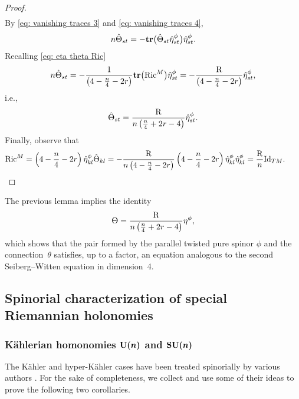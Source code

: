 \documentclass[10pt,a4paper]{amsart}
\newcommand{\tr}{\mbox{\bf tr}}
\numberwithin{equation}{section}
\begin{document}
\begin{proof}
\begin{gather*}
\end{gather*}
By \eqref{eq: vanishing traces 3} and \eqref{eq: vanishing traces 4},
\begin{gather*}
n\hat\Theta_{st} =-\tr\big(\hat\Theta_{st}\hat\eta_{st}^\phi\big)\hat\eta_{st}^\phi.
\end{gather*}
Recalling \eqref{eq: eta theta Ric}
\begin{gather*}
n\hat\Theta_{st} = -{1\over \left(4-{n\over 4}-2r\right)}\tr\big({\rm Ric}^M\big)\hat\eta_{st}^\phi=-{{\rm R}\over \left(4-{n\over 4}-2r\right)}\hat\eta_{st}^\phi,
\end{gather*}
i.e.,
\begin{gather*}
\hat\Theta_{st} = {{\rm R}\over n\left({n\over 4}+2r-4\right)}\hat\eta_{st}^\phi.
\end{gather*}
Finally, observe that
\begin{gather*}
{\rm Ric}^M = \left(4-{n\over 4}-2r\right) \hat\eta_{kl}^\phi\hat\Theta_{kl}=
-{{\rm R}\over n\left(4-{n\over 4}-2r\right)} \left(4-{n\over 4}-2r\right) \hat\eta_{kl}^\phi \hat\eta_{kl}^\phi =
{{\rm R}\over n} {\rm Id}_{TM}.\tag*{\qed}
\end{gather*}\renewcommand{\qed}{}
\end{proof}

\begin{Remark} The previous lemma implies the identity
\begin{gather}
\Theta ={{\rm R}\over n\left({n\over 4}+2r-4\right)}\eta^\phi,\label{eq: second equation}
\end{gather}
which shows that the pair formed by the parallel twisted pure spinor $\phi$ and the connec\-tion~$\theta$ satisfies, up to a factor, an equation analogous to the second Seiberg--Witten equation in dimension~4.
\end{Remark}

\subsection{Spinorial characterization of special Riemannian holonomies}
\subsubsection[K\"ahlerian homonomies ${\rm U}(n)$ and ${\rm SU}(n)$]{K\"ahlerian homonomies $\boldsymbol{{\rm U}(n)}$ and $\boldsymbol{{\rm SU}(n)}$}

The K\"ahler and hyper-K\"ahler cases have been treated spinorially by various authors \cite{Hitchin,Kirchberg, Lawson, Moroianu, Wang}. For the sake of completeness, we collect and use some of their ideas to prove the following two corollaries.
\end{document}
